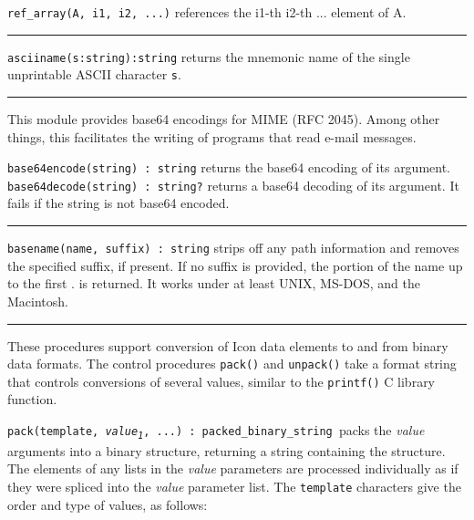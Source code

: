 \texttt{ref\_array(A, i1, i2, ...)} references the i1-th i2-th ...
element of A. 

\vspace{0.25cm}\hrule{}

\texttt{asciiname(s:string):string} returns the mnemonic name of the
single unprintable ASCII character \texttt{s}.

\vspace{0.25cm}\hrule{}

This module provides base64 encodings for MIME (RFC 2045).
Among other things, this facilitates the writing of programs that read
e-mail messages.

\texttt{base64encode(string) : string} returns the base64 encoding of
its argument.\\
\texttt{base64decode(string) : string?} returns a base64 decoding of its
argument. It fails if the string is not base64 encoded.

\vspace{0.25cm}\hrule{}

\texttt{basename}\texttt{(name, suffix) : string} strips
off any path information and removes the specified suffix, if present.
If no suffix is provided, the portion of the name up to the first
{\textquotedbl}.{\textquotedbl} is returned. It works under at least
UNIX, MS-DOS, and the Macintosh.

\vspace{0.25cm}\hrule{}

These procedures support conversion of Icon data elements
to and from binary data formats. The control procedures \texttt{pack()}
and \texttt{unpack()} take a format string that controls conversions of
several values, similar to the \texttt{printf()} C library function.

\texttt{pack(template,
}\texttt{\textit{value}}\texttt{\textit{\textsubscript{1}}}\texttt{,
...) : packed\_binary\_string}\texttt{ }packs the \textit{value}
arguments into a binary structure, returning a string containing the
structure. The elements of any lists in the \textit{value} parameters
are processed individually as if they were spliced into the
\textit{value} parameter list. The \texttt{template} characters give
the order and type of values, as follows:

